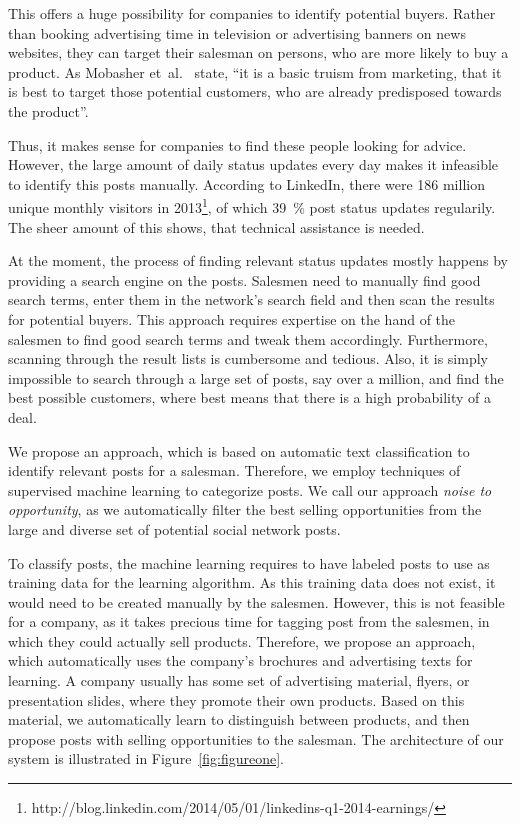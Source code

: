 This offers a huge possibility for companies to identify potential buyers.
Rather than booking advertising time in television or advertising banners on news websites, they can target their salesman on persons, who are more likely to buy a product.
As Mobasher et~al.~\cite{mobasher2007toward} state, ``it is a basic truism from marketing, that it is best to target those potential customers, who are already predisposed towards the product''.

Thus, it makes sense for companies to find these people looking for advice.
However, the large amount of daily status updates every day makes it infeasible to identify this posts manually.
According to LinkedIn, there were 186 million unique monthly visitors in 2013\footnote{http://blog.linkedin.com/2014/05/01/linkedins-q1-2014-earnings/}, of which 39~\% post status updates regularily.
The sheer amount of this shows, that technical assistance is needed.

At the moment, the process of finding relevant status updates mostly happens by providing a search engine on the posts.
Salesmen need to manually find good search terms, enter them in the network's search field and then scan the results for potential buyers.
This approach requires expertise on the hand of the salesmen to find good search terms and tweak them accordingly.
Furthermore, scanning through the result lists is cumbersome and tedious.
Also, it is simply impossible to search through a large set of posts, say over a million, and find the best possible customers, where best means that there is a high probability of a deal.

We propose an approach, which is based on automatic text classification to identify relevant posts for a salesman.
Therefore, we employ techniques of supervised machine learning to categorize posts.
We call our approach \emph{noise to opportunity}, as we automatically filter the best selling opportunities from the large and diverse set of potential social network posts.

To classify posts, the machine learning requires to have labeled posts to use as training data for the learning algorithm.
As this training data does not exist, it would need to be created manually by the salesmen.
However, this is not feasible for a company, as it takes precious time for tagging post from the salesmen, in which they could actually sell products.
Therefore, we propose an approach, which automatically uses the company's brochures and advertising texts for learning.
A company usually has some set of advertising material, flyers, or presentation slides, where they promote their own products.
Based on this material, we automatically learn to distinguish between products, and then propose posts with selling opportunities to the salesman.
The architecture of our system is illustrated in Figure~\ref{fig:figureone}.


